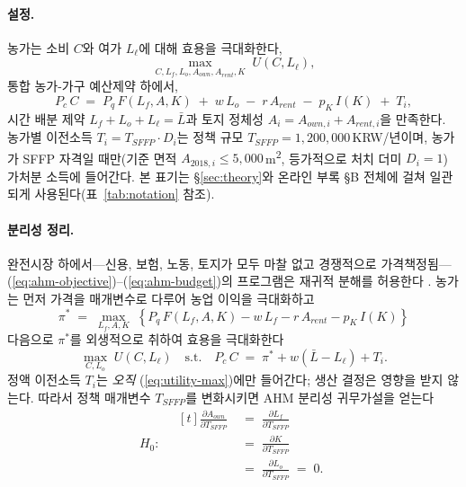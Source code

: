 \documentclass[12pt, a4paper]{article}
\begin{document}
\paragraph{설정.} 농가는 소비 $C$와 여가 $L_\ell$에 대해 효용을 극대화한다,
\begin{equation}
\max_{C, L_f, L_o, A_{own}, A_{rent}, K} \; U(C, L_\ell),
\label{eq:ahm-objective}
\end{equation}
통합 농가-가구 예산제약 하에서,
\begin{equation}
P_c\, C \;=\; P_q\, F(L_f, A, K) \;+\; w\, L_o \;-\; r\, A_{rent} \;-\; p_K\, I(K) \;+\; T_i,
\label{eq:ahm-budget}
\end{equation}
시간 배분 제약 $L_f + L_o + L_\ell = \bar L$과 토지 정체성 $A_i = A_{own,i} + A_{rent,i}$을 만족한다. 농가별 이전소득 $T_i = T_{SFFP} \cdot D_i$는 정책 규모 $T_{SFFP} = 1{,}200{,}000$\,KRW/년이며, 농가가 SFFP 자격일 때만(기준 면적 $A_{2018,i} \le 5{,}000$\,m\textsuperscript{2}, 등가적으로 처치 더미 $D_i = 1$) 가처분 소득에 들어간다. 본 표기는 \S\ref{sec:theory}와 온라인 부록 \S B 전체에 걸쳐 일관되게 사용된다(표~\ref{tab:notation} 참조).

\paragraph{분리성 정리.} 완전시장 하에서---신용, 보험, 노동, 토지가 모두 마찰 없고 경쟁적으로 가격책정됨---(\ref{eq:ahm-objective})--(\ref{eq:ahm-budget})의 프로그램은 재귀적 분해를 허용한다 \citep{SinghSquireStrauss1986_ahm}. 농가는 먼저 가격을 매개변수로 다루어 농업 이익을 극대화하고
\begin{equation}
\pi^* \;=\; \max_{L_f, A, K} \; \left\{ P_q\, F(L_f, A, K) - w\, L_f - r\, A_{rent} - p_K\, I(K) \right\}
\label{eq:profit-max}
\end{equation}
다음으로 $\pi^*$를 외생적으로 취하여 효용을 극대화한다
\begin{equation}
\max_{C, L_o} \; U(C, L_\ell) \quad \text{s.t.} \quad P_c\, C \;=\; \pi^* + w(\bar L - L_\ell) + T_i.
\label{eq:utility-max}
\end{equation}
정액 이전소득 $T_i$는 \emph{오직} (\ref{eq:utility-max})에만 들어간다; 생산 결정은 영향을 받지 않는다. 따라서 정책 매개변수 $T_{SFFP}$를 변화시키면 AHM 분리성 귀무가설을 얻는다
\begin{equation}
H_0: \quad \begin{aligned}[t]
  \frac{\partial A_{own}}{\partial T_{SFFP}}
  \;&=\; \frac{\partial L_f}{\partial T_{SFFP}} \\
  \;&=\; \frac{\partial K}{\partial T_{SFFP}} \\
  \;&=\; \frac{\partial L_o}{\partial T_{SFFP}} \;=\; 0.
\end{aligned}
\label{eq:null}
\end{equation}
\end{document}

